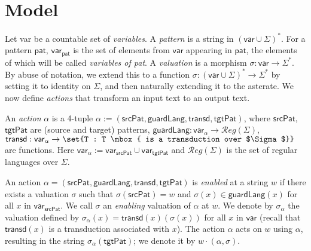 \documentclass[12pt, a4paper]{article}
\newcommand{\reg}{\mathcal{R}eg}
\newcommand{\var}{\textsf{var}}
\newcommand{\T}{\textsf{transd}}
\newcommand{\ssub}{\sigma} %
\newcommand{\spat}{\textsf{srcPat}}
\newcommand{\tpat}{\textsf{tgtPat}}
\newcommand{\VARpat}{\textsf{pat}}
\newcommand{\guardL}{\textsf{guardLang}}
\newcommand{\alphabet}{\Sigma}
\begin{document}

\section{Model}

Let \var{} be a countable set of \emph{variables}. A \emph{pattern} is a string in $(\var \cup \Sigma)^*$. For a pattern $\VARpat$, $\var_\VARpat$ is the set of elements from $\var$ appearing in $\VARpat$, the elements of which will be called \emph{variables of \VARpat}. A \emph{valuation} is a morphism $\sigma : \var \to \Sigma^*$. By abuse of notation, we extend this to a function $\sigma : (\var \cup \Sigma)^* \to \Sigma^*$ by setting it to identity on $\Sigma$, and then naturally extending it to the asterate.  We now define \textit{actions} that transform an input text to an output text.

An \emph{action} $\alpha$ is a 4-tuple $ \alpha := (\spat, \guardL, \T, \tpat)$, where $\spat$, $\tpat$ are (source and target) patterns, $\guardL: \var_\alpha \to \reg(\Sigma)$, $\T :\var_\alpha \to \set{T : T \mbox{ is a transduction over $\alphabet$}}$ are functions. Here $\var_\alpha := \var_\spat \cup \var_\tpat$ and $\reg(\Sigma)$ is the set of regular languages over $\Sigma$.

An action $\alpha = (\spat, \guardL, \T, \tpat)$ is \emph{enabled} at a string $w$ if there exists a valuation $\ssub$ such that $\sigma(\spat) = w$ and $\sigma(x) \in \guardL(x)$ for all $x$ in  $\var_\spat$. We call $\ssub$ an \emph{enabling} valuation of $\alpha$ at $w$. We denote by $\sigma_\alpha$ the valuation defined by $\sigma_\alpha(x)=\T(x)(\sigma(x))$ for all $x$ in $\var$ (recall that $\T(x)$ is a transduction associated with $x$). The action $\alpha$ acts on $w$ using $\alpha$, resulting in the string $\sigma_\alpha(\tpat)$; we denote it by $w\cdot (\alpha, \ssub)$.
\end{document}
